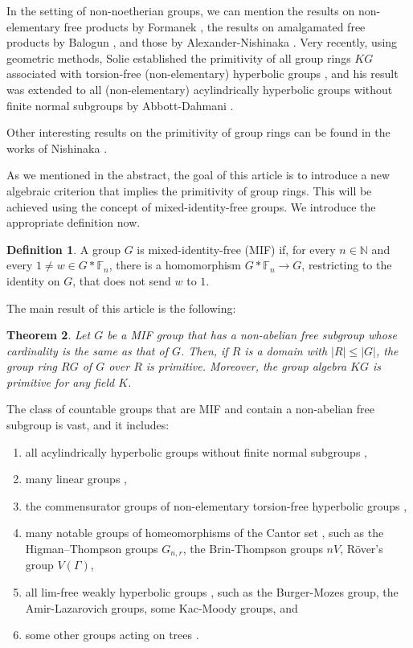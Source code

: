 \documentclass[11pt]{article}
\newtheorem{thm}{Theorem}[section]
\theoremstyle{definition}
\newtheorem{defn}[thm]{Definition}
\theoremstyle{remark}
\numberwithin{equation}{section}
\numberwithin{equation}{section}
\def\N{\mathbb{N}}
\numberwithin{equation}{section}
\begin{document}
In the setting of non-noetherian groups, we can mention the results on non-elementary free products by Formanek \cite{Fo73}, the results on amalgamated free products by Balogun \cite{Bo89}, and those by Alexander-Nishinaka \cite{AlNi17}. Very recently, using geometric methods, Solie established the primitivity of all group rings $KG$ associated with torsion-free (non-elementary) hyperbolic groups \cite{So18}, and his result was extended to all (non-elementary) acylindrically hyperbolic groups without finite normal subgroups by Abbott-Dahmani \cite{AbDa19}.

Other interesting results on the primitivity of group rings can be found in the works of Nishinaka \cite{Ni07,Ni11}.

As we mentioned in the abstract, the goal of this article is to introduce a new algebraic criterion that implies the primitivity of group rings. This will be achieved using the concept of mixed-identity-free groups. We introduce the appropriate definition now.


\begin{defn}\label{MIF}
    A group $G$ is mixed-identity-free (MIF) if, for every $n\in \N$ and every $1\neq w\in G*\mathbb F_n$, there is a homomorphism $G*\mathbb F_n\to G$, restricting to the identity on $G$, that does not send $w$ to $1$.
\end{defn}


The main result of this article is the following:

\begin{thm}\label{mainthm}
   Let $G$ be a MIF group that has a non-abelian free subgroup whose cardinality is the same as that of $G$. Then, if $R$ is a domain with $|R| \leq |G|$, the group ring $RG$ of $G$ over $R$ is primitive. Moreover, the group algebra $KG$ is primitive for any field $K$.
\end{thm}

The class of countable groups that are MIF and contain a non-abelian free subgroup is vast, and it includes:

\begin{enumerate}
    \item[(i)] all acylindrically hyperbolic groups without finite normal subgroups \cite{HuOs16},
    \item[(ii)] many linear groups \cite{AvGe25},
    \item[(iii)] the commensurator groups of non-elementary torsion-free hyperbolic groups \cite{BaFl26},
    \item[(iv)] many notable groups of homeomorphisms of the Cantor set \cite{BlElHy24}, such as the Higman–Thompson groups $G_{n,r}$, the Brin-Thompson groups $nV$, R\"over’s group $V(\Gamma)$,
    \item[(v)] all lim-free weakly hyperbolic groups \cite{Ry26}, such as the Burger-Mozes group, the Amir-Lazarovich groups, some Kac-Moody groups, and
    \item[(vi)] some other groups acting on trees \cite{BrIvOm20,FLMS}. 
\end{enumerate}
\end{document}
